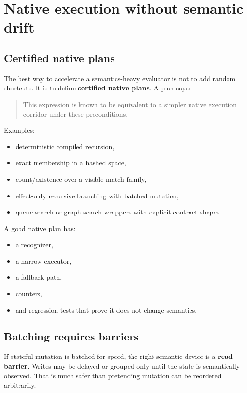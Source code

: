 \documentclass[11pt]{article}
\begin{document}
\section{Native execution without semantic drift}

\subsection{Certified native plans}

The best way to accelerate a semantics-heavy evaluator is not to add random shortcuts. It is to define \textbf{certified native plans}. A plan says:

\begin{quote}
This expression is known to be equivalent to a simpler native execution corridor under these preconditions.
\end{quote}

Examples:
\begin{itemize}
    \item deterministic compiled recursion,
    \item exact membership in a hashed space,
    \item count/existence over a visible match family,
    \item effect-only recursive branching with batched mutation,
    \item queue-search or graph-search wrappers with explicit contract shapes.
\end{itemize}

A good native plan has:
\begin{itemize}
    \item a recognizer,
    \item a narrow executor,
    \item a fallback path,
    \item counters,
    \item and regression tests that prove it does not change semantics.
\end{itemize}

\subsection{Batching requires barriers}

If stateful mutation is batched for speed, the right semantic device is a \textbf{read barrier}. Writes may be delayed or grouped only until the state is semantically observed. That is much safer than pretending mutation can be reordered arbitrarily.
\end{document}
